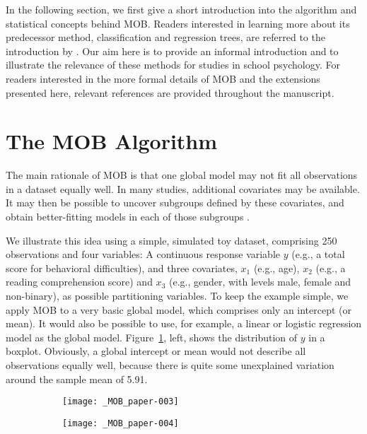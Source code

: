 \documentclass[doc,floatsintext,natbib]{apa7}
\begin{document}
In the following section, we first give a short introduction into the algorithm and statistical concepts behind MOB. Readers interested in learning more about its predecessor method, classification and regression trees, are referred to the introduction by \citet{StrMalTut:2009:PM}. Our aim here is to provide an informal introduction and to illustrate the relevance of these methods for studies in school psychology. For readers interested in the more formal details of MOB and the extensions presented here, relevant references are provided throughout the manuscript. 

\section{The MOB Algorithm}

The main rationale of MOB is that one global model may not fit all observations in a dataset equally well. In many studies, additional covariates may be available. It may then be possible to uncover subgroups defined by these covariates, and obtain better-fitting models in each of those subgroups \citep{ZeilyHoth08}. 



We illustrate this idea using a simple, simulated toy dataset, comprising 250 observations and four variables: A continuous response variable $y$ (e.g., a total score for behavioral difficulties), and three covariates, $x_1$ (e.g., age), $x_2$ (e.g., a reading comprehension score) and $x_3$ (e.g., gender, with levels male, female and non-binary), as possible partitioning variables. To keep the example simple, we apply MOB to a very basic global model, which comprises %
only an intercept (or mean). It would also be possible to use, for example, a linear or logistic regression model as the global model. Figure~\ref{fig:toy}, left, shows the distribution of $y$ in a boxplot. Obviously, a global intercept or mean would not describe all observations equally well, because there is quite some unexplained variation around the sample mean of 5.91.


\begin{figure}[h]
\caption{Left: Univariate distribution of the response variable. Right: Tree with group-specific distributions of the response variable in the terminal nodes.}
\begin{subfigure}[][][t]{.4\textwidth}
\texttt{[image: \_MOB\_paper-003]}
\end{subfigure}
\begin{subfigure}[][][b]{.7\textwidth}
\texttt{[image: \_MOB\_paper-004]}
\end{subfigure}
\label{fig:toy}
\end{figure}
\end{document}

